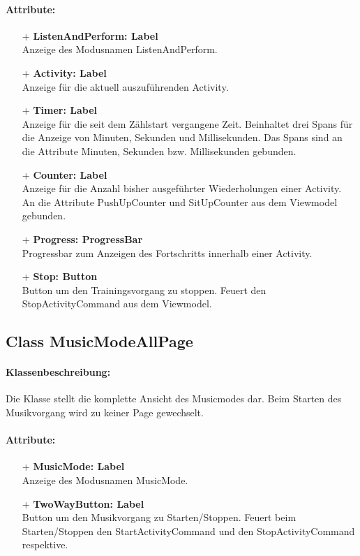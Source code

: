 \documentclass[a4paper,12pt]{article}
\begin{document}
\paragraph{Attribute:}
	\begin{itemize}
	\item[+] \textbf{ListenAndPerform: Label} \\ Anzeige des Modusnamen ListenAndPerform.
	\item[+] \textbf{Activity: Label} \\ Anzeige für die aktuell auszuführenden Activity.
	\item[+] \textbf{Timer: Label} \\ Anzeige für die seit dem Zählstart vergangene Zeit. Beinhaltet drei Spans für die Anzeige von Minuten, Sekunden und Millisekunden. Das Spans sind an die Attribute Minuten, Sekunden bzw. Millisekunden gebunden.
	\item[+] \textbf{Counter: Label} \\ Anzeige für die Anzahl bisher ausgeführter Wiederholungen einer Activity. An die Attribute PushUpCounter und SitUpCounter aus dem Viewmodel gebunden.
	\item[+] \textbf{Progress: ProgressBar} \\ Progressbar zum Anzeigen des Fortschritts innerhalb einer Activity.
	\item[+] \textbf{Stop: Button} \\ Button um den Trainingsvorgang zu stoppen. Feuert den StopActivityCommand aus dem Viewmodel.
	\end{itemize}
	
\subsection{Class MusicModeAllPage}
\paragraph{Klassenbeschreibung:}
Die Klasse stellt die komplette Ansicht des Musicmodes dar. Beim Starten des Musikvorgang wird zu keiner Page gewechselt.
\paragraph{Attribute:}
	\begin{itemize}
	\item[+] \textbf{MusicMode: Label} \\ Anzeige des Modusnamen MusicMode.
	\item[+] \textbf{TwoWayButton: Label} \\ Button um den Musikvorgang zu Starten/Stoppen. Feuert beim Starten/Stoppen den StartActivityCommand und den StopActivityCommand respektive.
	\end{itemize}
\end{document}
